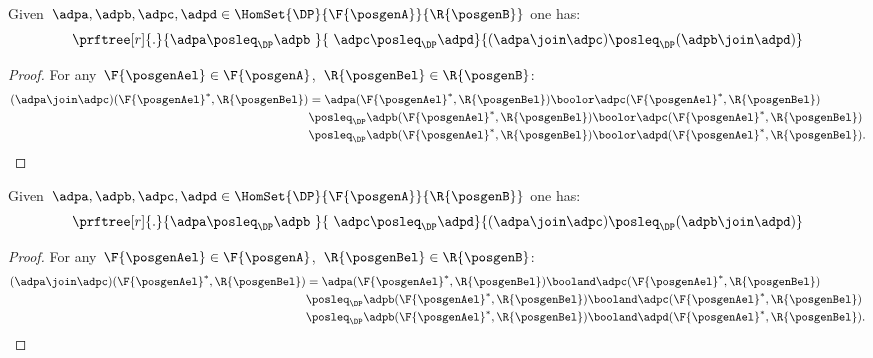\begin{lemma}
    \label{lem:coprod_mon}
    Given~$\adpa,\adpb,\adpc,\adpd \in \HomSet{\DP}{\F{\posgenA}}{\R{\posgenB}}$ one has:
    \begin{equation*}
        \prftree[r]{.}{\adpa\posleq_\DP \adpb\ }{\ \adpc\posleq_\DP\adpd}{(\adpa\join\adpc)\posleq_\DP (\adpb\join \adpd)}
    \end{equation*}
\end{lemma}
\begin{proof}
    For any~$\F{\posgenAel}\in \F{\posgenA}$,~$\R{\posgenBel}\in \R{\posgenB}$:
    \begin{equation*}
        \begin{aligned}
        (\adpa \join \adpc)(\F{\posgenAel}^*,\R{\posgenBel})
            &=\adpa(\F{\posgenAel}^*,\R{\posgenBel})\boolor \adpc(\F{\posgenAel}^*,\R{\posgenBel})\\
            &\posleq_\DP \adpb(\F{\posgenAel}^*,\R{\posgenBel})\boolor \adpc(\F{\posgenAel}^*,\R{\posgenBel})\\
            &\posleq_\DP \adpb(\F{\posgenAel}^*,\R{\posgenBel})\boolor \adpd(\F{\posgenAel}^*,\R{\posgenBel}).
        \end{aligned}
    \end{equation*}
\end{proof}



\begin{lemma}
    \label{lem:intersection_mon}
    Given~$\adpa,\adpb,\adpc,\adpd \in \HomSet{\DP}{\F{\posgenA}}{\R{\posgenB}}$ one has:
    \begin{equation*}
        \prftree[r]{.}{\adpa\posleq_\DP \adpb\ }{\ \adpc\posleq_\DP \adpd}{(\adpa\join \adpc)\posleq_\DP (\adpb\join \adpd)}
    \end{equation*}
\end{lemma}
\begin{proof}
    For any~$\F{\posgenAel}\in \F{\posgenA}$,~$\R{\posgenBel}\in \R{\posgenB}$:
    \begin{equation*}
        \begin{aligned}
        (\adpa \join \adpc)(\F{\posgenAel}^*,\R{\posgenBel})
            &=\adpa(\F{\posgenAel}^*,\R{\posgenBel})\booland \adpc(\F{\posgenAel}^*,\R{\posgenBel})\\
            &\posleq_\DP \adpb(\F{\posgenAel}^*,\R{\posgenBel})\booland \adpc(\F{\posgenAel}^*,\R{\posgenBel})\\
            &\posleq_\DP \adpb(\F{\posgenAel}^*,\R{\posgenBel})\booland \adpd(\F{\posgenAel}^*,\R{\posgenBel}).
        \end{aligned}
    \end{equation*}
\end{proof}